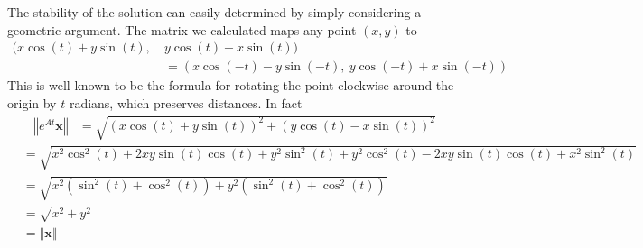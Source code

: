 \documentclass{article}
\begin{document}
\begin{itemize}
		The stability of the solution can easily determined by simply
		considering a geometric argument.  The matrix we calculated maps
		any point $(x,y)$ to
		\begin{align*}
			(x \cos(t) + y \sin(t),\  &y \cos(t) - x \sin(t)) \\
			&= (x \cos(-t) - y \sin(-t),\  y \cos(-t) + x \sin(-t))
		\end{align*}  This is well known to be the formula for rotating
		the point clockwise around the origin by $t$ radians, which
		preserves distances. In fact
		\begin{align*}
			\left\Vert e^{At} \mathbf{x} \right\Vert
			&= \sqrt{(x \cos(t) + y \sin(t))^2 + (y \cos(t) - x
			\sin(t))^2}
		\end{align*}
		\begin{align*}
			&=  \sqrt{x^2 \cos^2(t) + 2 x y \sin(t) \cos(t) + y^2
			\sin^2(t) + y^2 \cos^2(t) - 2 x y \sin(t) \cos(t) + x^2
			\sin^2(t)} \\
			&= \sqrt{x^2 (\sin^2(t) + \cos^2(t)) + y^2 (\sin^2(t) +
			\cos^2(t))} \\
			&= \sqrt{x^2 + y^2} \\
			&= \left\Vert \mathbf{x} \right\Vert
		\end{align*}


\end{itemize}
\end{document}
